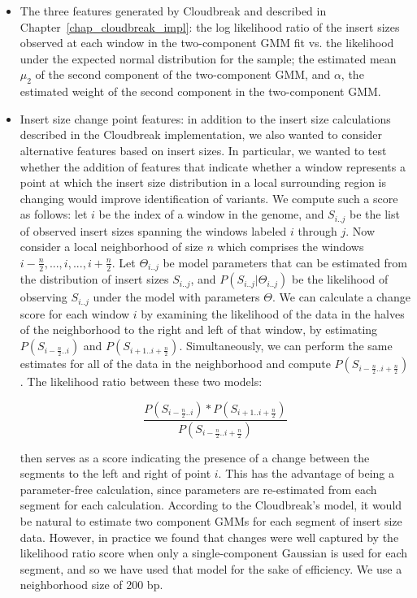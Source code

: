 \begin{itemize}

\item The three features generated by Cloudbreak and described in Chapter~\ref{chap_cloudbreak_impl}: the log likelihood ratio of the insert sizes observed at each window in the two-component GMM fit vs. the likelihood under the expected normal distribution for the sample; the estimated mean $\mu_2$ of the second component of the two-component GMM, and $\alpha$, the estimated weight of the second component in the two-component GMM.

\item Insert size change point features: in addition to the insert size calculations described in the Cloudbreak implementation, we also wanted to consider alternative features based on insert sizes. In particular, we wanted to test whether the addition of features that indicate whether a window represents a point at which the insert size distribution in a local surrounding region is changing would improve identification of variants. We compute such a score as follows: let $i$ be the index of a window in the genome, and $S_{i..j}$ be the list of observed insert sizes spanning the windows labeled $i$ through $j$. Now consider a local neighborhood of size $n$ which comprises the windows $i-\frac{n}{2},...,i,...,i+\frac{n}{2}$. Let $\Theta_{i..j}$ be model parameters that can be estimated from the distribution of insert sizes $S_{i..j}$, and $P(S_{i..j}|\Theta_{i..j})$ be the likelihood of observing $S_{i..j}$ under the model with parameters $\Theta$. We can calculate a change score for each window $i$ by examining the likelihood of the data in the halves of the neighborhood to the right and left of that window, by estimating $P(S_{i-\frac{n}{2}..i})$ and $P(S_{i+1..i+\frac{n}{2}})$. Simultaneously, we can perform the same estimates for all of the data in the neighborhood and compute $P(S_{i-\frac{n}{2}..i+\frac{n}{2}})$. The likelihood ratio between these two models:

\[ \frac{P(S_{i-\frac{n}{2}..i}) * P(S_{i+1..i+\frac{n}{2}})}{ P(S_{i-\frac{n}{2}..i+\frac{n}{2}})} \]

then serves as a score indicating the presence of a change between the segments to the left and right of point $i$. This has the advantage of being a parameter-free calculation, since parameters are re-estimated from each segment for each calculation. According to the Cloudbreak's model, it would be natural to estimate two component GMMs for each segment of insert size data. However, in practice we found that changes were well captured by the likelihood ratio score when only a single-component Gaussian is used for each segment, and so we have used that model for the sake of efficiency. We use a neighborhood size of 200 bp.

\end{itemize}


